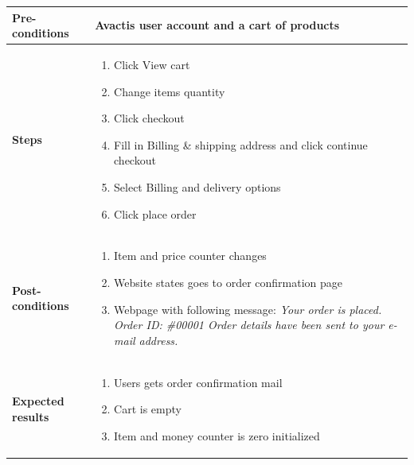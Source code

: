 \documentclass[UKenglish,12pt]{article}
\begin{document}
\begin{enumerate}
\begin{tabular}{| p{5cm} | p{10cm} | }
	 \textbf{Pre-conditions} & Avactis user account and a cart of products \\ \hline
	 \textbf{Steps} & \begin{enumerate} \item Click View cart \item Change items quantity \item Click checkout \item Fill in Billing \& shipping address and click continue checkout \item Select Billing and delivery options \item Click place order
	 \end{enumerate} \\ \hline
	\textbf{Post-conditions} & \begin{enumerate}\item Item and price counter changes \item Website states goes to order confirmation page \item Webpage with following message: \textit{Your order is placed. Order ID: \#00001 Order details have been sent to your e-mail address.}  \end{enumerate} \\ \hline
	 \textbf{Expected results} & \begin{enumerate}\item Users gets order confirmation mail \item Cart is empty \item Item and money counter is zero initialized \end{enumerate}\\ 
	 \hline
\end{tabular} %



\end{enumerate}
\end{document}
